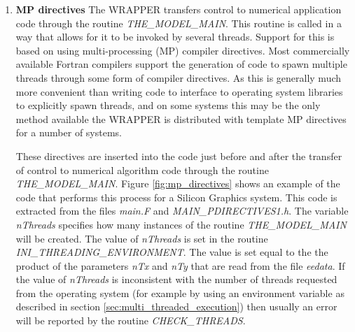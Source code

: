 \begin{enumerate}
\item {\bf MP directives}
The WRAPPER transfers control to numerical application code through
the routine {\em THE\_MODEL\_MAIN}. This routine is called in a way
that allows for it to be invoked by several threads. Support for this
is based on using multi-processing (MP) compiler directives.
Most commercially available Fortran compilers support the generation
of code to spawn multiple threads through some form of compiler directives.
As this is generally much more convenient than writing code to interface
to operating system libraries to explicitly spawn threads, and on some systems
this may be the only method available the WRAPPER is distributed with
template MP directives for a number of systems.

 These directives are inserted into the code just before and after the 
transfer of control to numerical algorithm code through the routine
{\em THE\_MODEL\_MAIN}. Figure \ref{fig:mp_directives} shows an example of 
the code that performs this process for a Silicon Graphics system.
This code is extracted from the files {\em main.F} and
{\em MAIN\_PDIRECTIVES1.h}. The variable {\em nThreads} specifies
how many instances of the routine {\em THE\_MODEL\_MAIN} will
be created. The value of {\em nThreads} is set in the routine
{\em INI\_THREADING\_ENVIRONMENT}. The value is set equal to the
the product of the parameters {\em nTx} and {\em nTy} that
are read from the file {\em eedata}. If the value of {\em nThreads}
is inconsistent with the number of threads requested from the
operating system (for example by using an environment
variable as described in section \ref{sec:multi_threaded_execution})
then usually an error will be reported by the routine 
{\em CHECK\_THREADS}.\\



\end{enumerate}

